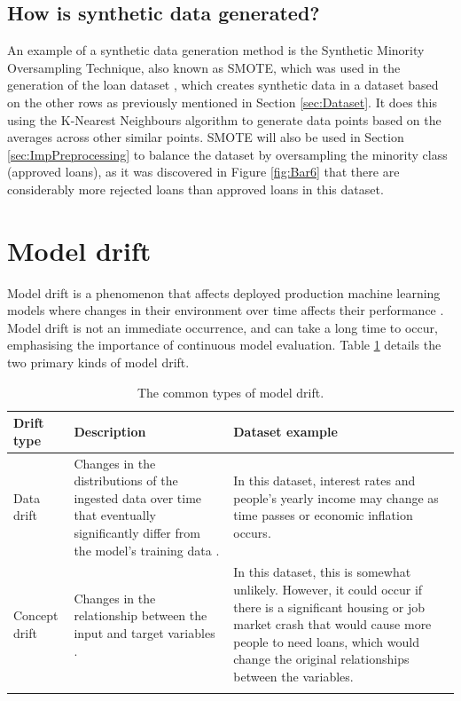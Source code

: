 \documentclass[12pt]{report}
\begin{document}
\subsection{How is synthetic data generated?}
An example of a synthetic data generation method is the Synthetic Minority Oversampling Technique, also known as SMOTE, which was used
in the generation of the loan dataset \autocite{zoppelleto_financial_nodate}, which creates synthetic data in a dataset based on the
other rows as previously mentioned in Section \ref{sec:Dataset}. It does this using the K-Nearest Neighbours algorithm to generate 
data points based on the averages across other similar points. SMOTE will also be used in Section \ref{sec:ImpPreprocessing} to balance
the dataset by oversampling the minority class (approved loans), as it was discovered in Figure \ref{fig:Bar6} that there are considerably 
more rejected loans than approved loans in this dataset.

\section{Model drift}
Model drift is a phenomenon that affects deployed production machine learning models where changes in 
their environment over time affects their performance \autocite{nigenda_amazon_2022}. Model drift is not an 
immediate occurrence, and can take a long time to occur, emphasising the importance of continuous model evaluation. 
Table \ref{tab:Drift} details the two primary kinds of model drift.

\pagebreak

\begin{longtable}{ | p{} | p{} | p{} |}
    \hline
    \cellcolor{blue!25}Drift type & \cellcolor{blue!25}Description & \cellcolor{blue!25}Dataset example\\
    \hline
    Data drift & Changes in the distributions of the ingested data over time that eventually significantly differ from the model's training data \autocite{datacamp_understanding_nodate}.
    & In this dataset, interest rates and people's yearly income may change as time passes or economic inflation occurs.\\
    \hline
    Concept drift & Changes in the relationship between the input and target variables \autocite{nigenda_amazon_2022}. 
    & In this dataset, this is somewhat unlikely. However, it could occur if there is a significant housing or job market crash 
    that would cause more people to need loans, which would change the original relationships between the variables.\\
    \hline
\caption{The common types of model drift.}\label{tab:Drift}
\end{longtable}
\end{document}
